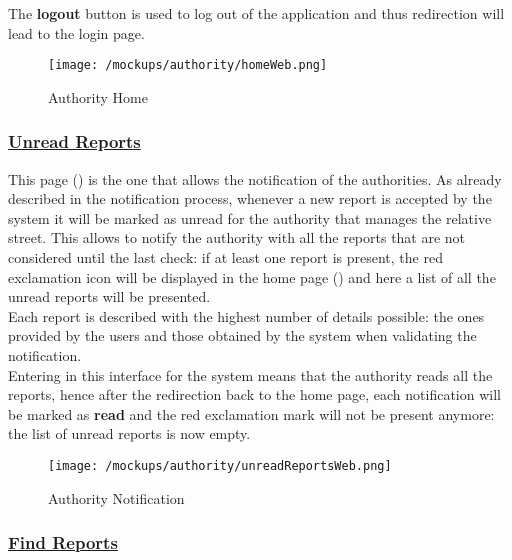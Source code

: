 				The \textbf{logout} button is used to log out of the application and thus redirection will lead to the login page.
				
				\newpage
				
				\begin{figure}[ht!]
					\centering
					\texttt{[image: /mockups/authority/homeWeb.png]}
					\caption{\label{fig:homeWeb} Authority Home}
				\end{figure}
			
			\subsubsection[Unread Reports]{\hyperlink{toc}{Unread Reports}}
				\label{sec:authorityCheckReports}
				
				This page () is the one that allows the notification of the authorities. As already described in the notification process, whenever a new report is accepted by the system it will be marked as unread for the authority that manages the relative street. This allows to notify the authority with all the reports that are not considered until the last check: if at least one report is present, the red exclamation icon will be displayed in the home page () and here a list of all the unread reports will be presented.\\
				
				Each report is described with the highest number of details possible: the ones provided by the users and those obtained by the system when validating the notification. \\
				
				Entering in this interface for the system means that the authority reads all the reports, hence after the redirection back to the home page, each notification will be marked as \textbf{read} and the red exclamation mark will not be present anymore: the list of unread reports is now empty.
				
				\newpage
				
				\begin{figure}[ht!]
					\centering
					\texttt{[image: /mockups/authority/unreadReportsWeb.png]}
					\caption{\label{fig:unreadReports} Authority Notification}
				\end{figure}
			
			\subsubsection[Find Reports]{\hyperlink{toc}{Find Reports}}
				\label{sec:authorityFindReports}
				
